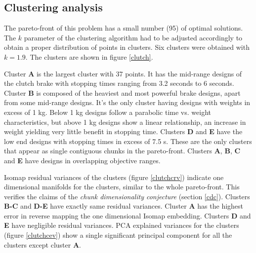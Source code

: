 \subsection{Clustering analysis}
The pareto-front of this problem has a small number (95) of optimal
solutions. The $k$ parameter of the clustering algorithm had to be adjusted
accordingly to obtain a proper distribution of points in clusters. Six
clusters were obtained with $k = 1.9$. The clusters are shown in figure
\ref{clutch}.

Cluster \textbf{A} is the largest cluster with 37 points. It has the
mid-range designs of the clutch brake with stopping times ranging from 3.2
seconds to 6 seconds. Cluster \textbf{B} is composed of the heaviest and
most powerful brake designs, apart from some mid-range designs. It's the
only cluster having designs with weights in excess of 1 kg. Below 1 kg
designs follow a parabolic time vs. weight characteristics, but above 1 kg
designs show a linear relationship, an increase in weight yielding very
little benefit in stopping time. Clusters \textbf{D} and \textbf{E} have
the low end designs with stopping times in excess of 7.5 s. These are the
only clusters that appear as single contiguous chunks in the
pareto-front. Clusters \textbf{A}, \textbf{B}, \textbf{C} and \textbf{E}
have designs in overlapping objective ranges.

Isomap residual variances of the clusters (figure \ref{clutchcrv})
indicate one dimensional manifolds for the clusters, similar to the whole
pareto-front. This verifies the claims of the {\em chunk dimensionality
  conjecture} (section \ref{cdc}). Clusters \textbf{B-C} and \textbf{D-E}
have exactly same residual variances.  Cluster \textbf{A} has the highest
error in reverse mapping the one dimensional Isomap embedding. Clusters
\textbf{D} and \textbf{E} have negligible residual variances. PCA explained
variances for the clusters (figure \ref{clutchcev}) show a single
significant principal component for all the clusters except cluster
\textbf{A}.


